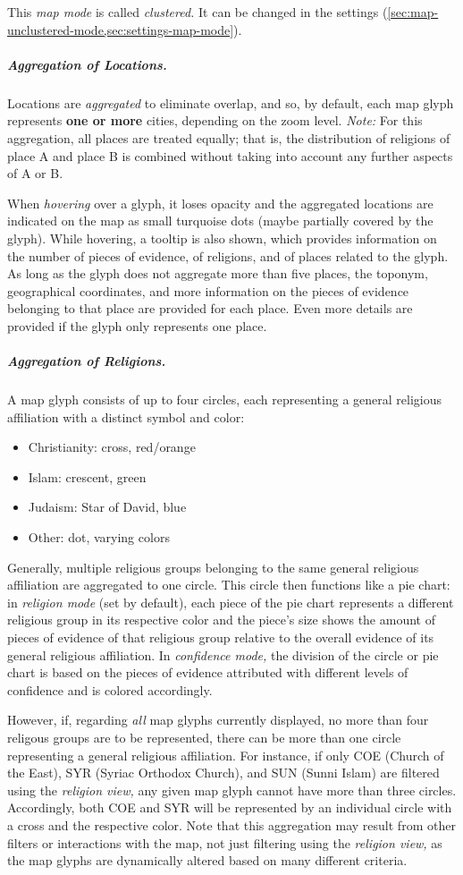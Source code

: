 This \emph{map mode} is called \emph{clustered.}
It can be changed in the settings (\cref{sec:map-unclustered-mode,sec:settings-map-mode}).


\subparagraph{Aggregation of Locations.}
Locations are \emph{aggregated} to eliminate overlap, and so, by default, each map glyph represents \textbf{one or more} cities, depending on the zoom level.
\emph{Note:} For this aggregation, all places are treated equally;
that is, the distribution of religions of place A and place B is combined without taking into account any further aspects of A or B.

When \emph{hovering} over a glyph, it loses opacity and the aggregated locations are indicated on the map as small turquoise dots (maybe partially covered by the glyph).
While hovering, a tooltip is also shown, which provides information on the number of pieces of evidence, of religions, and of places related to the glyph.
As long as the glyph does not aggregate more than five places, the toponym, geographical coordinates, and more information on the pieces of evidence belonging to that place are provided for each place.
Even more details are provided if the glyph only represents one place.

\subparagraph{Aggregation of Religions.}
A map glyph consists of up to four circles, each representing a general religious affiliation with a distinct symbol and color:

\begin{itemize}
  \item Christianity: cross, red/orange
  \item Islam: crescent, green
  \item Judaism: Star of David, blue
  \item Other: dot, varying colors
\end{itemize}

Generally, multiple religious groups belonging to the same general religious affiliation are aggregated to one circle.
This circle then functions like a pie chart:
in \emph{religion mode} (set by default), each piece of the pie chart represents a different religious group in its respective color and the piece's size shows the amount of pieces of evidence of that religious group relative to the overall evidence of its general religious affiliation.
In \emph{confidence mode,} the division of the circle or pie chart is based on the pieces of evidence attributed with different levels of confidence and is colored accordingly.

However, if, regarding \emph{all} map glyphs currently displayed, no more than four religous groups are to be represented, there can be more than one circle representing a general religious affiliation.
For instance, if only COE (Church of the East), SYR (Syriac Orthodox Church), and SUN (Sunni Islam) are filtered using the \emph{religion view,} any given map glyph cannot have more than three circles.
Accordingly, both COE and SYR will be represented by an individual circle with a cross and the respective color.
Note that this aggregation may result from other filters or interactions with the map, not just filtering using the \emph{religion view,} as the map glyphs are dynamically altered based on many different criteria.

